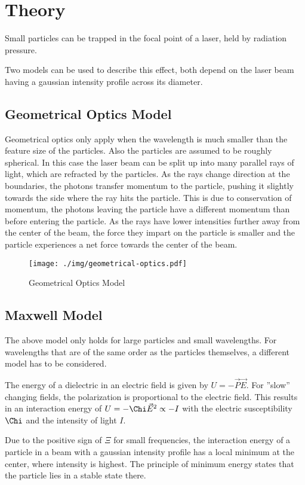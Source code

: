 \chapter{Theory}
Small particles can be trapped in the focal point of a laser, held by radiation pressure.

Two models can be used to describe this effect, both depend on the laser beam having a gaussian intensity profile across its diameter.

\section{Geometrical Optics Model}
Geometrical optics only apply when the wavelength is much smaller than the feature size of the particles.
Also the particles are assumed to be roughly spherical.
In this case the laser beam can be split up into many parallel rays of light, which are refracted by the particles.
As the rays change direction at the boundaries, the photons transfer momentum to the particle, pushing it slightly towards the side where the ray hits the particle.
This is due to conservation of momentum, the photons leaving the particle have a different momentum than before entering the particle.
As the rays have lower intensities further away from the center of the beam, the force they impart on the particle is smaller and the particle experiences a net force towards the center of the beam.
\begin{figure}[bp]
  \centering
  \texttt{[image: ./img/geometrical-optics.pdf]}
  \caption{Geometrical Optics Model}
\end{figure}

\section{Maxwell Model}
The above model only holds for large particles and small wavelengths.
For wavelengths that are of the same order as the particles themselves, a different model has to be considered.

The energy of a dielectric in an electric field is given by $U = -\vec{P}\vec{E}$.
For ''slow'' changing fields, the polarization is proportional to the electric field.
This results in an interaction energy of $U = -\Chi \vec{E}^2 \propto -I$ with the electric susceptibility $\Chi$ and the intensity of light $I$.

Due to the positive sign of $\Xi$ for small frequencies, the interaction energy of a particle in a beam with a gaussian intensity profile has a local minimum at the center, where intensity is highest.
The principle of minimum energy states that the particle lies in a stable state there. 



